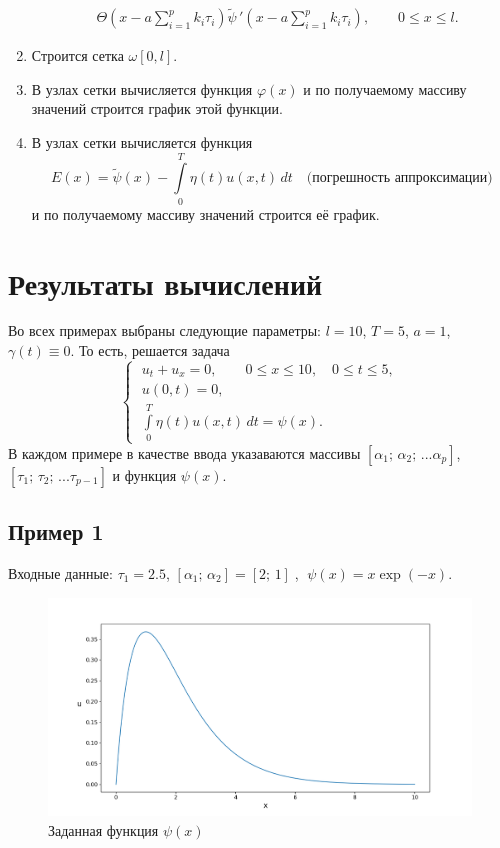 \documentclass{article}
\renewcommand{\le}{\leqslant}
\theoremstyle{definition}
\begin{document}
\begin{enumerate}
\begin{equation*}
\begin{aligned}
	& \Theta\!\left(x - a\sum\limits_{i = 1}^{p}k_i\tau_i \right)\widetilde{\psi}\,'\!
	\left(x - a\sum\limits_{i = 1}^{p}k_i\tau_i\right), 
	\qquad 0 \le x \le l.
	\end{aligned}
	\end{equation*}
	\item Строится сетка $\omega[0,l]$. 
	\item В узлах сетки вычисляется функция $\varphi(x)$ и по получаемому массиву значений 
	строится график этой функции.
	\item В узлах сетки вычисляется функция
	\begin{equation*}
		E(x) = \widetilde{\psi}(x) - \int\limits_0^T \eta(t)u(x,t) \,dt \quad \text{(погрешность аппроксимации)}
	\end{equation*}
	и по получаемому массиву значений строится её график.
\end{enumerate}

\newpage

\section{Результаты вычислений}
Во всех примерах выбраны следующие параметры: $l = 10$,  $T = 5$,  $a = 1$, $\gamma(t) \equiv 0$.
То есть, решается задача
\begin{equation*}
\begin{cases}
	\; u_t + u_x = 0, \qquad 0 \le x \le 10, \quad 0 \le t \le 5, \\[3mm]
	\; u(0,t) = 0, \\[1mm]
	\; \int\limits_{0}^{T} \eta(t) u(x,t)\,dt = \psi(x).
\end{cases}
\end{equation*}
В каждом примере в качестве ввода указаваются массивы 
$[\alpha_1;\, \alpha_2;\, ... \alpha_p]$, \\$[\tau_1;\, \tau_2;\, ... \tau_{p-1}]$ и функция $\psi(x)$.

\newpage
\subsection{Пример 1}
Входные данные: 
$\tau_1 = 2.5$, $[\alpha_1;\, \alpha_2] = [2;\, 1]\;$, $\;\psi(x) = x\exp(-x)$.
\begin{figure}[H]
	\centering
	\includegraphics[trim={2.1cm, 0.6cm, 0, 1.5cm}, clip, scale=0.615]{1_psi.png}
	\caption{Заданная функция $\psi(x)$}
	\label{fig:image1}
\end{figure}
\end{document}
